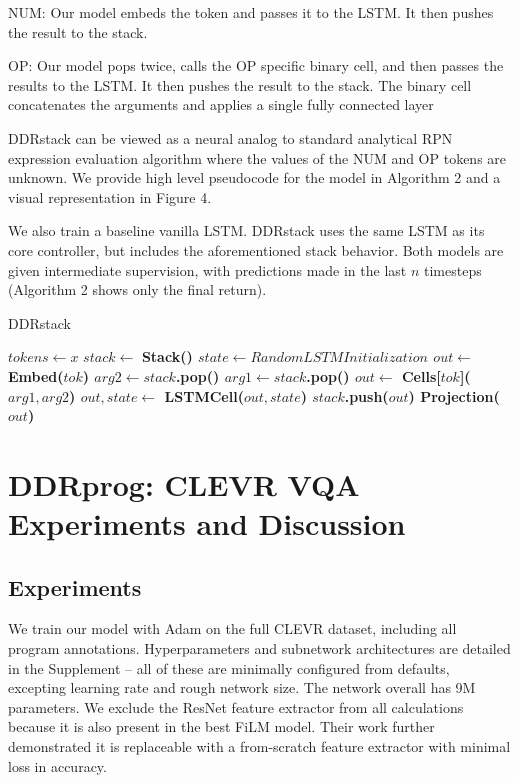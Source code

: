\documentclass{article}
\begin{document}
NUM: Our model embeds the token and passes it to the LSTM. It then pushes the result to the stack. 

OP: Our model pops twice, calls the OP specific binary cell, and then passes the results to the LSTM. It then pushes the result to the stack. The binary cell concatenates the arguments and applies a single fully connected layer


DDRstack can be viewed as a neural analog to standard analytical RPN expression evaluation algorithm where the values of the NUM and OP tokens are unknown. We provide high level pseudocode for the model in Algorithm 2 and a visual representation in Figure 4. 

We also train a baseline vanilla LSTM. DDRstack uses the same LSTM as its core controller, but includes the aforementioned stack behavior. Both models are given intermediate supervision, with predictions made in the last $n$ timesteps (Algorithm 2 shows only the final return).

\begin{algorithm}[H]
\caption{DDRstack}
\begin{algorithmic}
\INPUT $tokens \gets x$
\STATE $stack \gets$ \bf{Stack}()
\STATE $state \gets RandomLSTMInitialization$
    	\STATE $out \gets$ \bf{Embed}($tok$)
		\STATE $arg2 \gets stack$.\bf{pop}()
        \STATE $arg1 \gets stack$.\bf{pop}()
        \STATE $out \gets$ \bf{Cells}[$tok$]($arg1, arg2$)
    \ENDIF
    \STATE $out, state \gets$ \bf{LSTMCell}($out, state$)
	\STATE $stack$.\bf{push}($out$)
\ENDFOR
\OUTPUT \bf{Projection}($out$)
\end{algorithmic}
\end{algorithm}

\section{DDRprog: CLEVR VQA Experiments and Discussion}

\subsection{Experiments}
We train our model with Adam \cite{DBLP:journals/corr/KingmaB14} on the full CLEVR dataset, including all program annotations. Hyperparameters and subnetwork architectures are detailed in the Supplement -- all of these are minimally configured from defaults, excepting learning rate and rough network size. The network overall has 9M parameters. We exclude the ResNet feature extractor from all calculations because it is also present in the best FiLM model. Their work further demonstrated it is replaceable with a from-scratch feature extractor with minimal loss in accuracy. 
\end{document}
